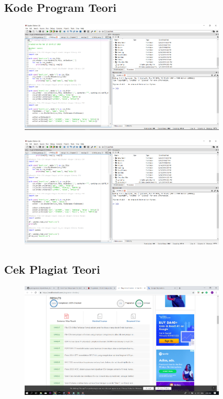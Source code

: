 \subsection{Kode Program Teori}
\begin{figure}[H]
	\includegraphics[width=10cm]{figures/4/1174026/Teori/kode_teori1.png}
	\centering
\end{figure}

\begin{figure}[H]
	\includegraphics[width=10cm]{figures/4/1174026/Teori/kode_teori2.png}
	\centering
\end{figure}

\subsection{Cek Plagiat Teori}

\begin{figure}[H]
	\includegraphics[width=10cm]{figures/4/1174026/Teori/plagiat_teori.png}
	\centering
\end{figure}

